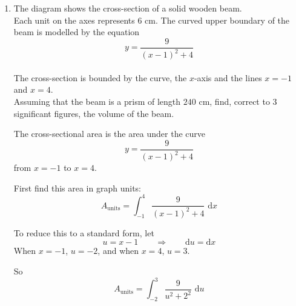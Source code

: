 \documentclass[leqno]{article}
\newcommand{\questionitem}{%
  \item\phantomsection
  \addcontentsline{toc}{section}{Question \number\value{enumi}}%
}
\begin{document}
\begin{enumerate}[
  label=\textbf{\arabic*.},
  leftmargin=*,
  topsep=0pt,
  partopsep=0pt,
  parsep=0pt
]
\newpage

\questionitem

\begin{figure}[H]
    \centering
{}
\end{figure}


The diagram shows the cross-section of a solid wooden beam. \\
Each unit on the axes represents $6$ cm. The curved upper boundary of the beam is modelled by the equation
\[
y=\frac{9}{(x-1)^2+4}
\] \\
The cross-section is bounded by the curve, the $x$-axis and the lines $x=-1$ and $x=4$. \\
Assuming that the beam is a prism of length $240$ cm, find, correct to $3$ significant figures, the volume of the beam.  \\

\vspace*{30pt}

\begin{tcolorbox}[colback=white, colframe=scarlet, title={\textbf{Solution}}, breakable, grow to left by=6mm, grow to right by=10mm]
The cross-sectional area is the area under the curve
\[
y=\frac{9}{(x-1)^2+4}
\]
from $x=-1$ to $x=4$.

First find this area in graph units:
\[
A_{\text{units}}=\int_{-1}^{4}\frac{9}{(x-1)^2+4}\,\,\mathrm{d}x
\]

To reduce this to a standard form, let
\[
u=x-1 \qquad \Rightarrow \qquad \mathrm{d}u=\mathrm{d}x
\]
When $x=-1$, $u=-2$, and when $x=4$, $u=3$.

So
\[
A_{\text{units}}=\int_{-2}^{3}\frac{9}{u^2+2^2}\,\,\mathrm{d}u
\]


\end{tcolorbox}
\end{enumerate}
\end{document}
